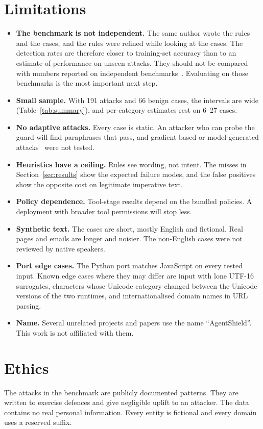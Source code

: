 \documentclass[10pt]{article}
\begin{document}
\section{Limitations}
\label{sec:limits}
\begin{itemize}
\item \textbf{The benchmark is not independent.} The same author wrote the rules and the cases, and the rules were refined while looking at the cases. The detection rates are therefore closer to training-set accuracy than to an estimate of performance on unseen attacks. They should not be compared with numbers reported on independent benchmarks~\citep{liu2024formalizing,yi2025bipia,zhan2024injecagent,debenedetti2024agentdojo}. Evaluating on those benchmarks is the most important next step.
\item \textbf{Small sample.} With 191 attacks and 66 benign cases, the intervals are wide (Table~\ref{tab:summary}), and per-category estimates rest on 6--27 cases.
\item \textbf{No adaptive attacks.} Every case is static. An attacker who can probe the guard will find paraphrases that pass, and gradient-based or model-generated attacks~\citep{zou2023universal} were not tested.
\item \textbf{Heuristics have a ceiling.} Rules see wording, not intent. The misses in Section~\ref{sec:results} show the expected failure modes, and the false positives show the opposite cost on legitimate imperative text.
\item \textbf{Policy dependence.} Tool-stage results depend on the bundled policies. A deployment with broader tool permissions will stop less.
\item \textbf{Synthetic text.} The cases are short, mostly English and fictional. Real pages and emails are longer and noisier. The non-English cases were not reviewed by native speakers.
\item \textbf{Port edge cases.} The Python port matches JavaScript on every tested input. Known edge cases where they may differ are input with lone UTF-16 surrogates, characters whose Unicode category changed between the Unicode versions of the two runtimes, and internationalised domain names in URL parsing.
\item \textbf{Name.} Several unrelated projects and papers use the name ``AgentShield''. This work is not affiliated with them.
\end{itemize}

\section{Ethics}
The attacks in the benchmark are publicly documented patterns. They are written to exercise defences and give negligible uplift to an attacker. The data contains no real personal information. Every entity is fictional and every domain uses a reserved suffix.
\end{document}

